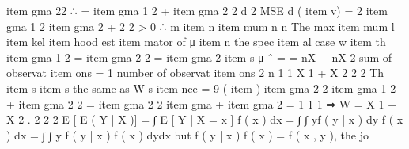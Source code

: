 \s%
item gma 22
∴ \alpha=
\s%
item gma 1 2 + \s%
item gma 2 2
d 2 MSE
d 
(%
item v)
= 2
\s%
item gma 1 2
\s%
item gma 2
+ 2 2 > 0 ∴ m%
item n%
item mum
n
n
The max%
item mum l%
item kel%
item hood est%
item mator of μ %
item n the spec%
item al case w%
item th
\s%
item gma 1 2 = \s%
item gma 2 2 = \s%
item gma 2 %
item s
μ ˆ =
=
nX + nX 2
sum of observat%
item ons
= 1
number of observat%
item ons
2 n
1
1
X 1 + X 2
2
2
Th%
item s %
item s the same as W s%
item nce
\alpha=
9
(%
item )
\s%
item gma 2 2
\s%
item gma 1 2
+ \s%
item gma 2 2
=
\s%
item gma 2
2
\s%
item gma +\s%
item gma
2
=
1
1
1
⇒ W = X 1 + X 2 .
2
2
2
E [ E ( Y | X )] = ∫ E [ Y | X = x ] f ( x ) dx
= ∫ ∫ yf ( y | x ) dy f ( x ) dx
= ∫ ∫ y f ( y | x ) f ( x ) dydx
but f ( y | x ) f ( x ) = f ( x , y ), the jo%
